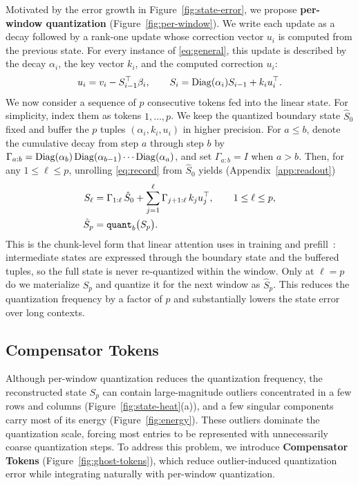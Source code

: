 \vspace{0.5\baselineskip}
Motivated by the error growth in Figure~\ref{fig:state-error}, we propose \textbf{per-window quantization} (Figure~\ref{fig:per-window}).
We write each update as a decay followed by a rank-one update whose correction vector $u_i$ is computed from the previous state.
For every instance of \eqref{eq:general}, this update is described by the decay $\alpha_i$, the key vector $k_i$, and the computed correction $u_i$:
\begin{equation}
  u_i=v_i-S_{i-1}^{\top}\beta_i,
  \qquad S_i=\operatorname{Diag}(\alpha_i)S_{i-1}+k_i u_i^{\top}.
  \label{eq:record}
\end{equation}
We now consider a sequence of $p$ consecutive tokens fed into the linear state.
For simplicity, index them as tokens $1,\ldots,p$.
We keep the quantized boundary state $\hat S_0$ fixed and buffer the $p$ tuples $(\alpha_i,k_i,u_i)$ in higher precision.
For $a\le b$, denote the cumulative decay from step $a$ through step $b$ by $\Gamma_{a:b}=\operatorname{Diag}(\alpha_b)\operatorname{Diag}(\alpha_{b-1})\cdots\operatorname{Diag}(\alpha_a)$, and set $\Gamma_{a:b}=I$ when $a>b$.
Then, for any $1\le\ell\le p$, unrolling \eqref{eq:record} from $\hat S_0$ yields (Appendix~\ref{app:readout})
\begin{equation}
  \begin{aligned}
    S_\ell &= \Gamma_{1:\ell}\,\hat S_0
       + \sum_{j=1}^{\ell}\Gamma_{j+1:\ell}\,k_j u_j^{\top},
       \qquad 1\le\ell\le p,\\
    \hat S_p &= \operatorname{\mathtt{quant}}_b\bigl(S_p\bigr).
  \end{aligned}
  \label{eq:window}
\end{equation}
This is the chunk-level form that linear attention uses in training and prefill~\citep{yang2024parallelizing,yang2025gated}: intermediate states are expressed through the boundary state and the buffered tuples, so the full state is never re-quantized within the window.
Only at $\ell=p$ do we materialize $S_p$ and quantize it for the next window as $\hat S_p$.
This reduces the quantization frequency by a factor of $p$ and substantially lowers the state error over long contexts.



\subsection{Compensator Tokens}
\label{sec:round2}

Although per-window quantization reduces the quantization frequency, the reconstructed state $S_p$ can contain large-magnitude outliers concentrated in a few rows and columns (Figure~\ref{fig:state-heat}(a)), and a few singular components carry most of its energy (Figure~\ref{fig:energy}).
These outliers dominate the quantization scale, forcing most entries to be represented with unnecessarily coarse quantization steps.
To address this problem, we introduce \textbf{Compensator Tokens} (Figure~\ref{fig:ghost-tokens}), which reduce outlier-induced quantization error while integrating naturally with per-window quantization.

